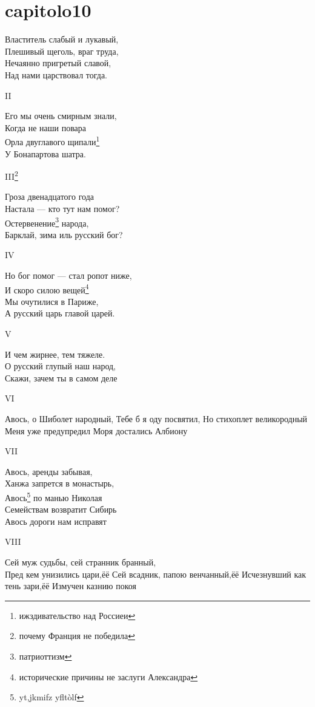 \chapter{capitolo10}\label{section:cap10}


Властитель слабый и лукавый,\\
Плешивый щеголь, враг труда,\\
Нечаянно пригретый славой,\\
Над нами царствовал тогда.

II

Его мы очень смирным знали,\\
Когда не наши повара\\
Орла двуглавого щипали\footnote{ижздивательство над Россиеи}\\
У Бонапартова шатра.

III\footnote{почему Франция не победила}

Гроза двенадцатого года\\
Настала — кто тут нам помог?\\
Остервенение\footnote{патриоттизм} народа,\\
Барклай, зима иль русский бог?

IV

Но бог помог — стал ропот ниже,\\
И скоро силою вещей\footnote{исторические причины не заслуги Александра}\\
Мы очутилися в Париже,\\
А русский царь главой царей.

V

И чем жирнее, тем тяжеле.\\
О русский глупый наш народ,\\
Скажи, зачем ты в самом деле

VI

Авось, о Шиболет народный,
Тебе б я оду посвятил,
Но стихоплет великородный
Меня уже предупредил
Моря достались Албиону

VII

Авось, аренды забывая,\\
Ханжа запрется в монастырь,\\
Авось\footnote{yt,jkmifz yfltòlf} по манью Николая\\
Семействам возвратит Сибирь\\
Авось дороги нам исправят

VIII

Сей муж судьбы, сей странник бранный,\\
Пред кем унизились цари,ёё
Сей всадник, папою венчанный,ёё
Исчезнувший как тень зари,ёё
Измучен казнию покоя

